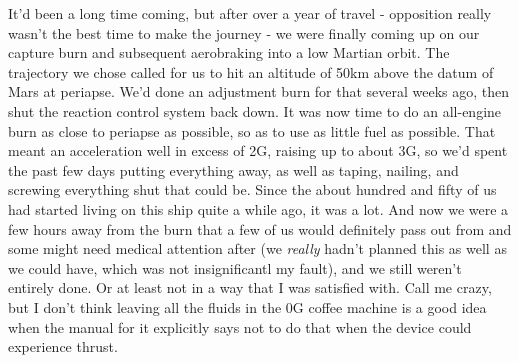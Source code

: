 It'd been a long time coming, but after over a year of travel - opposition
really wasn't the best time to make the journey - we were finally
coming up on our capture burn and subsequent aerobraking into a low Martian
orbit. The trajectory we chose called for us to hit an altitude of 50km above
the datum of Mars at periapse. We'd done an adjustment burn for that several
weeks ago, then shut the reaction control system back down. It was now time to
do an all-engine burn as close to periapse as possible, so as to use as little
fuel as possible. That meant an acceleration well in excess of 2G, raising up to
about 3G, so we'd spent the past few days putting everything away, as well as
taping, nailing, and screwing everything shut that could be. Since the about
hundred and fifty of us had started living on this ship quite a while ago, it
was a lot. And now we were a few hours away from the burn that a few of us would
definitely pass out from and some might need medical attention after (we
\textit{really} hadn't planned this as well as we could have, which was not
insignificantl my fault), and we still weren't entirely done. Or at least not in
a way that I was satisfied with. Call me crazy, but I don't think leaving all
the fluids in the 0G coffee machine is a good idea when the manual for it
explicitly says not to do that when the device could experience thrust.

